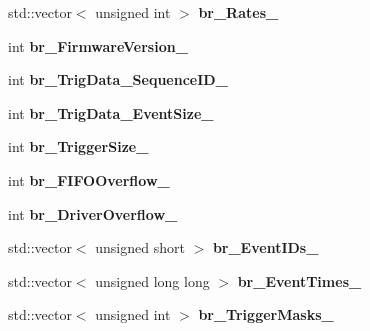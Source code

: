 \begin{DoxyCompactItemize}
\item 
\hypertarget{classannie_1_1RawReader_ae3ff1082360151c4829a05d2018e2417}{std\-::vector$<$ unsigned int $>$ {\bfseries br\-\_\-\-Rates\-\_\-}}\label{classannie_1_1RawReader_ae3ff1082360151c4829a05d2018e2417}

\item 
\hypertarget{classannie_1_1RawReader_a41f3d3f78fd043871f039c69876f341e}{int {\bfseries br\-\_\-\-Firmware\-Version\-\_\-}}\label{classannie_1_1RawReader_a41f3d3f78fd043871f039c69876f341e}

\item 
\hypertarget{classannie_1_1RawReader_aefc95d8ca60b7f4a8f2a119a96a08166}{int {\bfseries br\-\_\-\-Trig\-Data\-\_\-\-Sequence\-I\-D\-\_\-}}\label{classannie_1_1RawReader_aefc95d8ca60b7f4a8f2a119a96a08166}

\item 
\hypertarget{classannie_1_1RawReader_a70a0114d6e0814674244cf4baa50cccb}{int {\bfseries br\-\_\-\-Trig\-Data\-\_\-\-Event\-Size\-\_\-}}\label{classannie_1_1RawReader_a70a0114d6e0814674244cf4baa50cccb}

\item 
\hypertarget{classannie_1_1RawReader_a03e5b0feb7408b42ff8981fe03c75010}{int {\bfseries br\-\_\-\-Trigger\-Size\-\_\-}}\label{classannie_1_1RawReader_a03e5b0feb7408b42ff8981fe03c75010}

\item 
\hypertarget{classannie_1_1RawReader_a5c4fc04ee8d56fc7f68272ed8981a1c0}{int {\bfseries br\-\_\-\-F\-I\-F\-O\-Overflow\-\_\-}}\label{classannie_1_1RawReader_a5c4fc04ee8d56fc7f68272ed8981a1c0}

\item 
\hypertarget{classannie_1_1RawReader_a7b9ef32495564301dd76b88149707893}{int {\bfseries br\-\_\-\-Driver\-Overflow\-\_\-}}\label{classannie_1_1RawReader_a7b9ef32495564301dd76b88149707893}

\item 
\hypertarget{classannie_1_1RawReader_a905d6738fc7c22067b95a8fdf11159a1}{std\-::vector$<$ unsigned short $>$ {\bfseries br\-\_\-\-Event\-I\-Ds\-\_\-}}\label{classannie_1_1RawReader_a905d6738fc7c22067b95a8fdf11159a1}

\item 
\hypertarget{classannie_1_1RawReader_a88e6a3b0215bb06943f5fb533189a553}{std\-::vector$<$ unsigned long long $>$ {\bfseries br\-\_\-\-Event\-Times\-\_\-}}\label{classannie_1_1RawReader_a88e6a3b0215bb06943f5fb533189a553}

\item 
\hypertarget{classannie_1_1RawReader_a638cbc6290cbae41386606e6e528c152}{std\-::vector$<$ unsigned int $>$ {\bfseries br\-\_\-\-Trigger\-Masks\-\_\-}}\label{classannie_1_1RawReader_a638cbc6290cbae41386606e6e528c152}


\end{DoxyCompactItemize}

